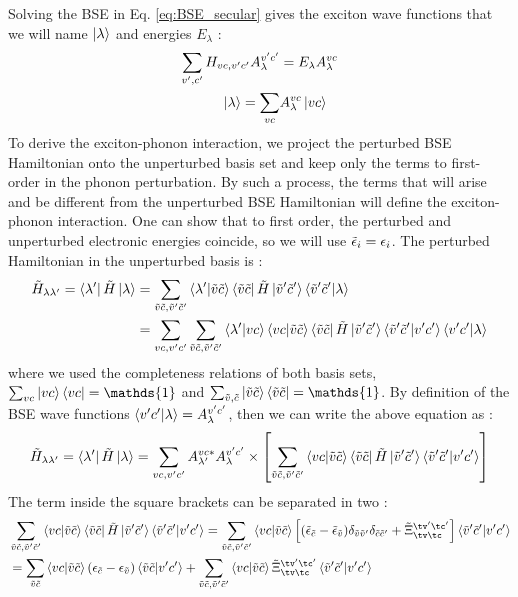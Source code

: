 Solving the \acrshort{BSE} in Eq. \eqref{eq:BSE_secular} gives the exciton wave functions that we will name $\ket{\lambda}$ and energies $E_{\lambda}$ :
\begin{align}
    \sum_{v',c'} H_{vc,v'c'} A_{\lambda}^{v'c'} &= E_{\lambda} A_{\lambda}^{vc} \\
    \ket{\lambda} = \sum_{vc}& A^{vc}_{\lambda}\ket{vc}
\end{align}
To derive the exciton-phonon interaction, we project the perturbed BSE Hamiltonian onto the unperturbed basis set and keep only the terms to first-order in the phonon perturbation. 
By such a process, the terms that will arise and be different from the unperturbed BSE Hamiltonian will define the exciton-phonon interaction.
One can show that to first order, the perturbed and unperturbed electronic energies coincide, so we will use $\Tilde{\epsilon}_i = \epsilon_i$. 
The perturbed Hamiltonian in the unperturbed basis is :
\begin{align*}
    \Tilde{H}_{\lambda\lambda'} = \bra{\lambda'} \Tilde{H} \ket{\lambda} &= \sum_{\Tilde{v}\Tilde{c},\Tilde{v}'\Tilde{c}'}  \bra{\lambda'}\ket{\Tilde{v}\Tilde{c}}\bra{\Tilde{v}\Tilde{c}} \Tilde{H} \ket{\Tilde{v}'\Tilde{c}'}\bra{\Tilde{v}'\Tilde{c}'}\ket{\lambda} \\
    &= \sum_{vc,v'c'}\sum_{\Tilde{v}\Tilde{c},\Tilde{v}'\Tilde{c}'} \bra{\lambda'}\ket{vc}\bra{vc}\ket{\Tilde{v}\Tilde{c}}\bra{\Tilde{v}\Tilde{c}} \Tilde{H} \ket{\Tilde{v}'\Tilde{c}'}\bra{\Tilde{v}'\Tilde{c}'}\ket{v'c'}\bra{v'c'}\ket{\lambda}
\end{align*}
where we used the completeness relations of both basis sets, $\sum_{vc}\ket{vc}\bra{vc} = \mathds{1}$ and $\sum_{\Tilde{v},\Tilde{c}} \ket{\Tilde{v}\Tilde{c}}\bra{\Tilde{v}\Tilde{c}} = \mathds{1}$. By definition of the BSE wave functions $\bra{v'c'}\ket{\lambda} = A_{\lambda}^{v'c'}$, then we can write the above equation as :
\begin{equation}
    \Tilde{H}_{\lambda\lambda'} = \bra{\lambda'} \Tilde{H} \ket{\lambda} = \sum_{vc,v'c'} A_{\lambda'}^{vc*} A_{\lambda}^{v'c'} \times \left[ \sum_{\Tilde{v}\Tilde{c},\Tilde{v}'\Tilde{c}'} \bra{vc}\ket{\Tilde{v}\Tilde{c}}  \bra{\Tilde{v}\Tilde{c}} \Tilde{H} \ket{\Tilde{v}'\Tilde{c}'} \bra{\Tilde{v}'\Tilde{c}'}\ket{v'c'} \right]
    \label{eq:exc_ham}
\end{equation}
The term inside the square brackets can be separated in two :
\begin{align*}
    &\sum_{\Tilde{v}\Tilde{c},\Tilde{v}'\Tilde{c}'} \bra{vc}\ket{\Tilde{v}\Tilde{c}}  \bra{\Tilde{v}\Tilde{c}} \Tilde{H} \ket{\Tilde{v}'\Tilde{c}'} \bra{\Tilde{v}'\Tilde{c}'}\ket{v'c'} =  \sum_{\Tilde{v}\Tilde{c},\Tilde{v}'\Tilde{c}'} \bra{vc}\ket{\Tilde{v}\Tilde{c}}  \left[ (\Tilde{\epsilon}_{\Tilde{c}} - \Tilde{\epsilon}_{\Tilde{v}}) \delta_{\Tilde{v}\Tilde{v}'}\delta_{\Tilde{c}\Tilde{c}'} + \tilde{\Xi}_{\tv\tc}^{\tv'\tc'} \right] \bra{\Tilde{v}'\Tilde{c}'}\ket{v'c'} \\
    &= \sum_{\Tilde{v}\Tilde{c}} \bra{vc}\ket{\Tilde{v}\Tilde{c}} (\epsilon_{\Tilde{c}} - \epsilon_{\Tilde{v}}) \bra{\Tilde{v}\Tilde{c}}\ket{v'c'} + \sum_{\Tilde{v}\Tilde{c},\Tilde{v}'\Tilde{c}'} \bra{vc}\ket{\Tilde{v}\Tilde{c}} \tilde{\Xi}_{\tv\tc}^{\tv'\tc'} \bra{\Tilde{v}'\Tilde{c}'}\ket{v'c'}
\end{align*}
